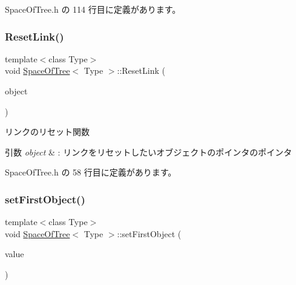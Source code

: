  Space\+Of\+Tree.\+h の 114 行目に定義があります。

\mbox{\label{class_space_of_tree_a3231408434cb3066768cfd9d33d86190}} 
\subsubsection{\texorpdfstring{Reset\+Link()}{ResetLink()}}
{\footnotesize\ttfamily template$<$class Type$>$ \\
void \mbox{\hyperlink{class_space_of_tree}{Space\+Of\+Tree}}$<$ Type $>$\+::Reset\+Link (\begin{DoxyParamCaption}\item[{\mbox{\hyperlink{class_object_of_tree}{Object\+Of\+Tree}}$<$ Type $>$ $\ast$$\ast$}]{object }\end{DoxyParamCaption})\hspace{0.3cm}{\ttfamily [inline]}}



リンクのリセット関数 


\begin{DoxyParams}{引数}
{\em object} & \+: リンクをリセットしたいオブジェクトのポインタのポインタ \\
\hline
\end{DoxyParams}


 Space\+Of\+Tree.\+h の 58 行目に定義があります。

\mbox{\label{class_space_of_tree_a43844bf7bfbf0d021b9ae4708cb2e6f4}} 
\subsubsection{\texorpdfstring{set\+First\+Object()}{setFirstObject()}}
{\footnotesize\ttfamily template$<$class Type$>$ \\
void \mbox{\hyperlink{class_space_of_tree}{Space\+Of\+Tree}}$<$ Type $>$\+::set\+First\+Object (\begin{DoxyParamCaption}\item[{\mbox{\hyperlink{class_object_of_tree}{Object\+Of\+Tree}}$<$ Type $>$ $\ast$}]{value }\end{DoxyParamCaption})\hspace{0.3cm}{\ttfamily [inline]}}



